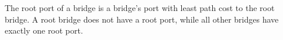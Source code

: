 The root port of a bridge is a bridge's port with least path cost to the root bridge. A root bridge does not have a root port, while all other bridges have exactly one root port.